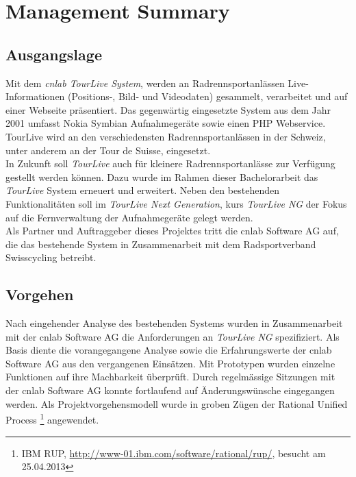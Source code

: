 \chapter*{Management Summary}
\section*{Ausgangslage}

Mit dem \textit{cnlab TourLive System}, werden an Radrennsportanlässen Live- Informationen (Positions-, Bild- und Videodaten) gesammelt, verarbeitet und auf einer Webseite präsentiert. Das gegenwärtig eingesetzte System aus dem Jahr 2001  umfasst Nokia Symbian Aufnahmegeräte sowie einen PHP Webservice. TourLive wird an den verschiedensten Radrennsportanlässen in der Schweiz, unter anderem an der Tour de Suisse, eingesetzt. 
\\

In Zukunft soll \textit{TourLive} auch für kleinere Radrennsportanlässe zur Verfügung gestellt werden können. Dazu wurde im Rahmen dieser Bachelorarbeit das \textit{TourLive} System erneuert und erweitert. Neben den bestehenden Funktionalitäten soll im \textit{TourLive Next Generation}, kurs \textit{TourLive NG} der Fokus auf die Fernverwaltung der Aufnahmegeräte gelegt werden. 
\\

Als Partner und Auftraggeber dieses Projektes tritt die cnlab Software AG auf, die das bestehende System in Zusammenarbeit mit dem Radsportverband Swisscycling betreibt.

\section*{Vorgehen}
Nach eingehender Analyse des bestehenden Systems wurden in Zusammenarbeit mit der cnlab Software AG die Anforderungen an \textit{TourLive NG} spezifiziert. Als Basis diente die vorangegangene Analyse sowie die  Erfahrungswerte der cnlab Software AG aus den vergangenen Einsätzen. Mit Prototypen wurden einzelne Funktionen auf ihre Machbarkeit überprüft. Durch regelmässige Sitzungen mit der cnlab Software AG konnte fortlaufend auf Änderungswünsche eingegangen werden. Als Projektvorgehensmodell wurde in groben Zügen der Rational Unified Process \footnote{IBM RUP, \url{http://www-01.ibm.com/software/rational/rup/}, besucht am 25.04.2013} angewendet.
\newpage 

